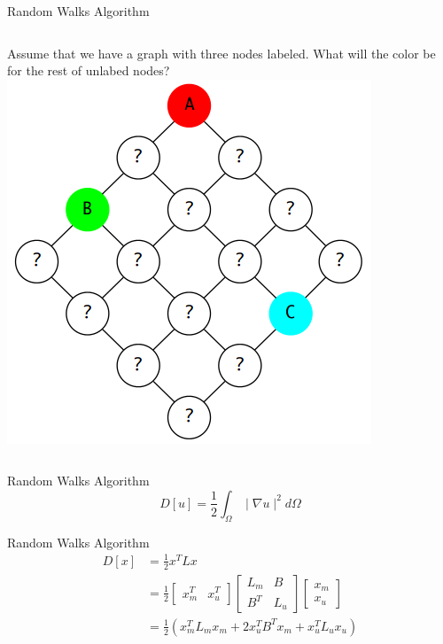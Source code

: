 \documentclass[14pt]{beamer}
\begin{document}
\begin{frame}{Random Walks Algorithm}
    \begin{columns}
        Assume that we have a graph with three nodes labeled.
        \newline\newline
        What will the color be for the rest of unlabed nodes?
        \includegraphics[scale=0.45]{eg1.png}
    \end{columns}
\end{frame}
\begin{frame}{Random Walks Algorithm}
    \[
        D[u] = \frac{1}{2} \int_{\Omega} \mid \nabla u\mid ^2 d\Omega
    \]
\end{frame}
\begin{frame}{Random Walks Algorithm}
    \begin{equation*}
        \begin{split}
            D[x] &= \frac{1}{2} x^TLx \\
                 &= \frac{1}{2} 
            \left[
                \begin{array}{cc}
                    x_m^T & x_u^T
                \end{array}
            \right]
            \left[
                \begin{array}{cc}
                    L_m & B \\
                    B^T & L_u
                \end{array}
            \right]
            \left[
                \begin{array}{cc}
                    x_m \\
                    x_u
                \end{array}
            \right] \\
            &= \frac{1}{2}(x_m^T L_m x_m + 2 x_u^T B^T x_m + x_u^T L_u x_u)
        \end{split}
    \end{equation*}
\end{frame}
\end{document}
